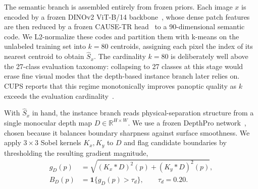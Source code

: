 \documentclass[10pt,twocolumn,letterpaper]{article}
\begin{document}
The semantic branch is assembled entirely from frozen priors. Each image $x$ is encoded by a frozen DINOv2 ViT-B/14 backbone~\cite{oquab2024dinov2}, whose dense patch features are then reduced by a frozen CAUSE-TR head~\cite{kim2024cause} to a 90-dimensional semantic code. We L2-normalize these codes and partition them with k-means on the unlabeled training set into $k = 80$ centroids, assigning each pixel the index of its nearest centroid to obtain $\hat S_x$. The cardinality $k = 80$ is deliberately well above the 27-class evaluation taxonomy: collapsing to 27 classes at this stage would erase fine visual modes that the depth-based instance branch later relies on. CUPS reports that this regime monotonically improves panoptic quality as $k$ exceeds the evaluation cardinality~\cite{hahn2025cups}.

With $\hat S_x$ in hand, the instance branch reads physical-separation structure from a single monocular depth map $D \in \mathbb{R}^{H \times W}$. We use a frozen DepthPro network~\cite{bochkovskii2024depthpro}, chosen because it balances boundary sharpness against surface smoothness. We apply $3 \times 3$ Sobel kernels $K_x, K_y$ to $D$ and flag candidate boundaries by thresholding the resulting gradient magnitude,
\begin{equation}
\begin{aligned}
g_D(p) &= \sqrt{(K_x * D)^2(p) + (K_y * D)^2(p)}, \\
B_D(p) &= \mathbf{1}\{g_D(p) > \tau_d\}, \qquad \tau_d = 0.20 .
\end{aligned}
\label{eq:depth_boundary}
\end{equation}
\end{document}
